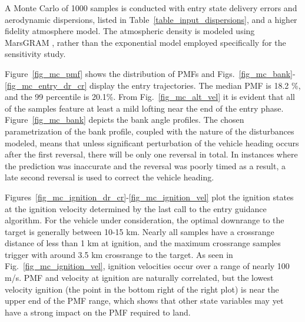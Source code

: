 \documentclass[letterpaper, paper,11pt]{AAS}
\begin{document}
A Monte Carlo of 1000 samples is conducted with entry state delivery errors and aerodynamic dispersions, listed in Table~\ref{table_input_dispersions}, and a higher fidelity atmosphere model. The atmospheric density is modeled using MarsGRAM \cite{MarsGRAM2010User}, rather than the exponential model employed specifically for the sensitivity study. 
 
Figure~\ref{fig_mc_pmf} shows the distribution of PMFs and
Figs.~\ref{fig_mc_bank}-\ref{fig_mc_entry_dr_cr} display the entry trajectories. The median PMF is 18.2 \%, and the 99 percentile is 20.1\%. From Fig.~\ref{fig_mc_alt_vel} it is evident that all of the samples feature at least a mild lofting near the end of the entry phase. 
Figure~\ref{fig_mc_bank} depicts the bank angle profiles. The chosen parametrization of the bank profile, coupled with the nature of the disturbances modeled, means that unless significant perturbation of the vehicle heading occurs after the first reversal, there will be only one reversal in total. In instances where the prediction was inaccurate and the reversal was poorly timed as a result, a late second reversal is used to correct the vehicle heading. 

Figures~\ref{fig_mc_ignition_dr_cr}-\ref{fig_mc_ignition_vel} plot the ignition states at the ignition velocity determined by the last call to the entry guidance algorithm. For the vehicle under consideration, the optimal downrange to the target is generally between 10-15 km. Nearly all samples have a crossrange distance of less than 1 km at ignition, and the maximum crossrange samples trigger with around 3.5 km crossrange to the target. As seen in Fig.~\ref{fig_mc_ignition_vel}, ignition velocities occur over a range of nearly 100 m/s. PMF and velocity at ignition are naturally correlated, but the lowest velocity ignition (the point in the bottom right of the right plot) is near the upper end of the PMF range, which shows that other state variables may yet have a strong impact on the PMF required to land.
\end{document}
